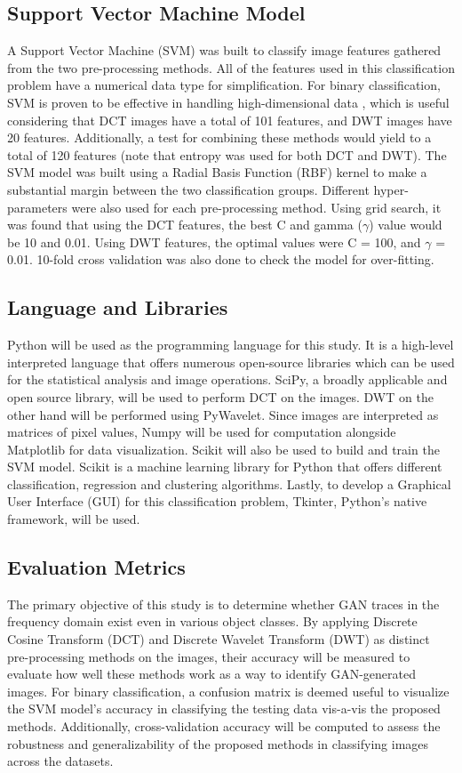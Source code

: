 \documentclass[journal]{./IEEE/IEEEtran}
\begin{document}
\subsection{Support Vector Machine Model}
A Support Vector Machine (SVM) was built to classify image features gathered from the two pre-processing methods. All of the features used in this classification problem have a numerical data type for simplification. For binary classification, SVM is proven to be effective in handling high-dimensional data \cite{ml-conrad, dwt}, which is useful considering that DCT images have a total of 101 features, and DWT images have 20 features. Additionally, a test for combining these methods would yield to a total of 120 features (note that entropy was used for both DCT and DWT). The SVM model was built using a Radial Basis Function (RBF) kernel to make a substantial margin between the two classification groups. Different hyper-parameters were also used for each pre-processing method. Using grid search, it was found that using the DCT features, the best C and gamma ($\gamma$) value would be 10 and 0.01. Using DWT features, the optimal values were C = 100, and  $\gamma$ = 0.01. 10-fold cross validation was also done to check the model for over-fitting. 

\subsection{Language and Libraries}
Python will be used as the programming language for this study. It is a high-level interpreted language that offers numerous open-source libraries which can be used for the statistical analysis and image operations. SciPy, a broadly applicable and open source library, will be used to perform DCT on the images. DWT on the other hand will be performed using PyWavelet. Since images are interpreted as matrices of pixel values, Numpy will be used for computation alongside Matplotlib for data visualization. Scikit will also be used to build and train the SVM model. Scikit is a machine learning library for Python that offers different classification, regression and clustering algorithms. Lastly, to develop a Graphical User Interface (GUI) for this classification problem, Tkinter, Python’s native framework, will be used.

\subsection{Evaluation Metrics}
The primary objective of this study is to determine whether GAN traces in the frequency domain exist even in various object classes. By applying Discrete Cosine Transform (DCT) and Discrete Wavelet Transform (DWT) as distinct pre-processing methods on the images, their accuracy will be measured to evaluate how well these methods work as a way to identify GAN-generated images. For binary classification, a confusion matrix is deemed useful to visualize the SVM model's accuracy in classifying the testing data vis-a-vis the proposed methods. Additionally, cross-validation accuracy will be computed to assess the robustness and generalizability of the proposed methods in classifying images across the datasets.
\end{document}
